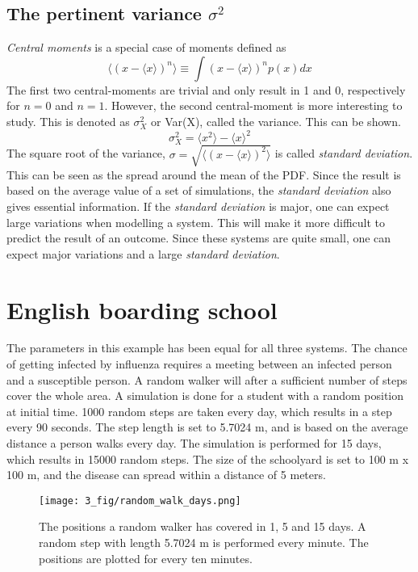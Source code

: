 \documentclass[%
twoside,                 %
final,                   %
chapterprefix=true,      %
open=right               %
10pt]{book}
\begin{document}
\subsection{The pertinent variance $\sigma ^2$}
\emph{Central moments} is a special case of moments defined as
\begin{equation}
    \langle (x-\langle x \rangle)^n \rangle \equiv \int (x-\langle x \rangle)^np(x)dx
\end{equation}
The first two central-moments are trivial and only result in 1 and 0, respectively for $n=0$ and $n=1$. However, the second central-moment is more interesting to study. This is denoted as $\sigma^2_X$ or Var(X), called the variance. This can be shown.
\begin{equation}
    \sigma^2_X  = \langle x^2\rangle -\langle x \rangle^2 
\end{equation}
The square root of the variance, $\sigma = \sqrt{\langle (x-\langle x \rangle)^2 \rangle}$ is called \emph{standard deviation}. This can be seen as the spread around the mean of the PDF. Since the result is based on the average value of a set of simulations, the \emph{standard deviation} also gives essential information. If the \emph{standard deviation} is major, one can expect large variations when modelling a system. This will make it more difficult to predict the result of an outcome. Since these systems are quite small, one can expect major variations and a large \emph{standard deviation}. 

\section{English boarding school}
The parameters in this example has been equal for all three systems. The chance of getting infected by influenza requires a meeting between an infected person and a susceptible person. A random walker will after a sufficient number of steps cover the whole area. A simulation is done for a student with a random position at initial time. 1000 random steps are taken every day, which results in a step every 90 seconds. The step length is set to 5.7024 m, and is based on the average distance a person walks every day. The simulation is performed for 15 days, which results in 15000 random steps. The size of the schoolyard is set to 100 m x 100 m, and the disease can spread within a distance of 5 meters.


\begin{figure}[ht]
  \centerline{\texttt{[image: 3\_fig/random\_walk\_days.png]}}
  \caption{
  \label{fig:random_walker_days} The positions a random walker has covered in 1, 5 and 15 days. A random step with length 5.7024 m is performed every minute. The positions are plotted for every ten minutes.
  }
\end{figure}
\end{document}
